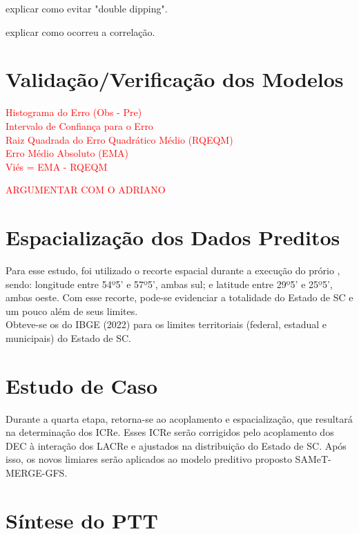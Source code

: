 \indent explicar como evitar "double dipping".

\indent explicar como ocorreu a correlação.


\section{Validação/Verificação dos Modelos}

\indent \textcolor{red}{Histograma do Erro (Obs - Pre)\\
\indent Intervalo de Confiança para o Erro\\
\indent Raiz Quadrada do Erro Quadrático Médio (RQEQM)\\
\indent Erro Médio Absoluto (EMA)\\
\indent Viés = EMA - RQEQM}

\indent \textcolor{red}{ARGUMENTAR COM O ADRIANO}

\section{Espacialização dos Dados Preditos}

\indent Para esse estudo, foi utilizado o recorte espacial durante a execução do prório , sendo: longitude entre 54º5' e 57º5', ambas sul; e latitude entre 29º5' e 25º5', ambas oeste. Com esse recorte, pode-se evidenciar a totalidade do Estado de \acrlong{SC} e um pouco além de seus limites.\\
\indent Obteve-se os  do \acrshort{IBGE} (2022) para os limites territoriais (federal, estadual e municipais) do Estado de \acrlong{SC}.\\

\section{Estudo de Caso}

\indent Durante a quarta etapa, retorna-se ao acoplamento e espacialização, que resultará na determinação dos \acrfull{ICRe}. Esses \acrshort{ICRe} serão corrigidos pelo acoplamento dos \acrshort{DEC} à interação dos \acrshort{LACRe} e ajustados na distribuição do Estado de \acrlong{SC}. Após isso, os novos limiares serão aplicados ao modelo preditivo proposto \acrshort{SAMeT}-\acrshort{MERGE}-\acrshort{GFS}.


\section{Síntese do \acrfull{PTT}} 

